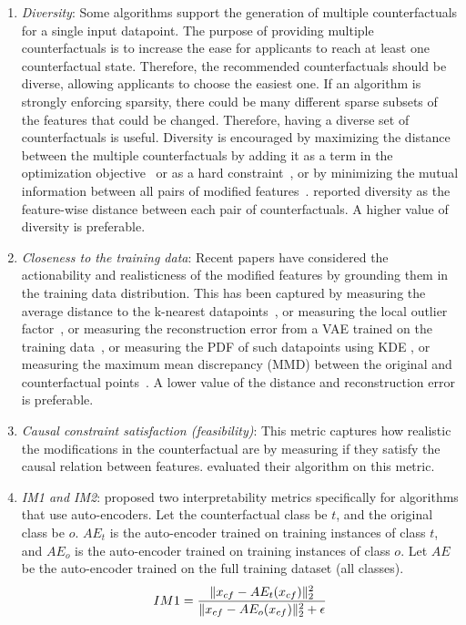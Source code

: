 \begin{enumerate}[leftmargin=*]
    \item \emph{Diversity}: Some algorithms support the generation of multiple counterfactuals for a single input datapoint. The purpose of providing multiple counterfactuals is to increase the ease for applicants to reach at least one counterfactual state. Therefore, the recommended counterfactuals should be diverse, allowing applicants to choose the easiest one. 
    If an algorithm is strongly enforcing sparsity, there could be many different sparse subsets of the features that could be changed. Therefore, having a diverse set of counterfactuals is useful. 
    Diversity is encouraged by maximizing the distance between the multiple counterfactuals by adding it as a term in the optimization objective~\citep{mothilal_explaining_2020,dandl_multi-objective_2020} or as a hard constraint~\citep{Ustun19:Actionable,karimi_model-agnostic_2020,scaling_Nearest_CFE}, or by minimizing the mutual information between all pairs of modified features~\citep{Grace:2019}. \citet{mothilal_explaining_2020} reported diversity as the feature-wise distance between each pair of counterfactuals. A higher value of diversity is preferable. 
    
    \item \emph{Closeness to the training data}: Recent papers have considered the actionability and realisticness of the modified features by grounding them in the training data distribution. This has been captured by measuring the average distance to the k-nearest datapoints~\citep{dandl_multi-objective_2020}, or measuring the local outlier factor~\citep{Kanamori2020:DACE}, or measuring the reconstruction error from a VAE trained on the training data~\citep{mahajan_preserving_2020,van_looveren_interpretable_2020}, or measuring the PDF of such datapoints using KDE \citep{coherent_CFEs}, or measuring the maximum mean discrepancy (MMD) between the original and counterfactual points~\citep{conditional_gan_cfe_looveren}. A lower value of the distance and reconstruction error is preferable. 
    
    \item \emph{Causal constraint satisfaction (feasibility)}: This metric captures how realistic the modifications in the counterfactual are by measuring if they satisfy the causal relation between features. \citet{mahajan_preserving_2020} evaluated their algorithm on this metric.
    
    \item \emph{IM1 and IM2}: \citet{van_looveren_interpretable_2020} proposed two interpretability metrics specifically for algorithms that use auto-encoders. Let the counterfactual class be $t$, and the original class be $o$. $AE_t$ is the auto-encoder trained on training instances of class $t$, and $AE_o$ is the auto-encoder trained on training instances of class $o$. Let $AE$ be the auto-encoder trained on the full training dataset (all classes).
    \begin{equation}
        IM1 = \frac{\|x_{cf} - AE_t(x_{cf})\|_2^2}{\|x_{cf} - AE_o(x_{cf})\|_2^2 + \epsilon}
    \end{equation}
    

\end{enumerate}
